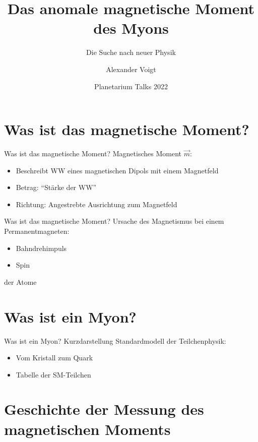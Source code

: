 \documentclass[12pt]{beamer}
\title{Das anomale magnetische Moment des Myons}
\subtitle{Die Suche nach neuer Physik}
\author[Voigt]{Alexander Voigt}
\institute[HS Flensburg]{Hochschule Flensburg}
\date{Planetarium Talks 2022}
\begin{document}

\begin{frame}
  \titlepage
\end{frame}


\section{Was ist das magnetische Moment?}

\begin{frame}{Was ist das magnetische Moment?}
  Magnetisches Moment $\vec{m}$:
  \begin{itemize}
  \item Beschreibt WW eines magnetischen Dipols mit einem Magnetfeld
  \item Betrag: "`Stärke der WW"'
  \item Richtung: Angestrebte Ausrichtung zum Magnetfeld
  \end{itemize}
\end{frame}

\begin{frame}{Was ist das magnetische Moment?}
  Ursache des Magnetismus bei einem Permanentmagneten:
  \begin{itemize}
  \item Bahndrehimpuls
  \item Spin
  \end{itemize}
  der Atome
\end{frame}


\section{Was ist ein Myon?}

\begin{frame}{Was ist ein Myon?}
  Kurzdarstellung Standardmodell der Teilchenphysik:
  \begin{itemize}
  \item Vom Kristall zum Quark
  \item Tabelle der SM-Teilchen
  \end{itemize}
\end{frame}


\section{Geschichte der Messung des magnetischen Moments}
\end{document}
